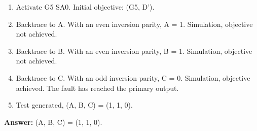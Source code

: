 
\begin{enumerate}
  \item Activate G5 SA0. Initial objective: (G5, D').
  \item Backtrace to A. With an even inversion parity, A = 1. Simulation, objective not achieved.
  \item Backtrace to B. With an even inversion parity, B = 1. Simulation, objective not achieved.
  \item Backtrace to C. With an odd inversion parity, C = 0. Simulation, objective achieved. The fault has reached the primary output.
  \item Test generated, (A, B, C) = (1, 1, 0).

\end{enumerate}

\textbf{Answer:} (A, B, C) = (1, 1, 0).

